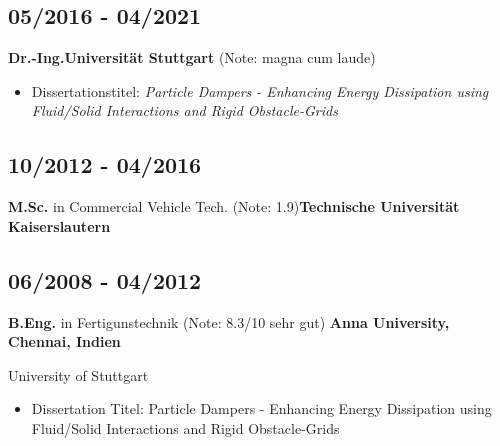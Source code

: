 \documentclass{mycv}
\begin{document}
{\rlap{\color{templateColor4}\rule[0mm]{\textwidth}{\ulinewidth}}}
\begin{paracol}{2}
    \switchcolumn
    {
            \subsection{05/2016 - 04/2021}{\bfseries Dr.-Ing.}{\bfseries Universit{\"a}t
            Stuttgart} {(Note: magna cum laude)}
              \begin{itemize}
                  \item Dissertationstitel: \textit{Particle Dampers - Enhancing
                      Energy Dissipation using Fluid/Solid Interactions and Rigid
                  Obstacle-Grids}
              \end{itemize}
            
              \subsection{10/2012 - 04/2016}{{\bfseries M.Sc.} in Commercial
            Vehicle Tech. (Note: 1.9)}{\bfseries Technische Universit{\"a}t Kaiserslautern
            }\\
            
            \subsection{06/2008 - 04/2012}{{\bfseries B.Eng.} in
            Fertigunstechnik (Note:
            8.3/10 {sehr gut})} {\bfseries Anna University, Chennai, Indien }\\
    
    }
    {
            {University of Stuttgart}
              \begin{itemize}
                  \item Dissertation Titel: Particle Dampers - Enhancing
                      Energy Dissipation using Fluid/Solid Interactions and Rigid
                      Obstacle-Grids
              \end{itemize}
    
            \\
    
}
\end{paracol}
\end{document}
